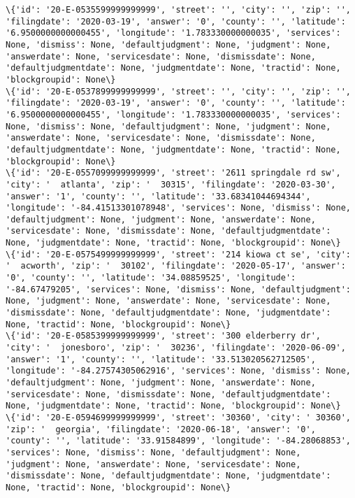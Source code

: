 \documentclass[11pt]{article}
\begin{document}
\begin{Verbatim}[commandchars=\\\{\}]
\{'id': '20-E-0535599999999999', 'street': '', 'city': '', 'zip': '', 'filingdate': '2020-03-19', 'answer': '0', 'county': '', 'latitude': '6.9500000000000455', 'longitude': '1.783330000000035', 'services': None, 'dismiss': None, 'defaultjudgment': None, 'judgment': None, 'answerdate': None, 'servicesdate': None, 'dismissdate': None, 'defaultjudgmentdate': None, 'judgmentdate': None, 'tractid': None, 'blockgroupid': None\}
\{'id': '20-E-0537899999999999', 'street': '', 'city': '', 'zip': '', 'filingdate': '2020-03-19', 'answer': '0', 'county': '', 'latitude': '6.9500000000000455', 'longitude': '1.783330000000035', 'services': None, 'dismiss': None, 'defaultjudgment': None, 'judgment': None, 'answerdate': None, 'servicesdate': None, 'dismissdate': None, 'defaultjudgmentdate': None, 'judgmentdate': None, 'tractid': None, 'blockgroupid': None\}
\{'id': '20-E-0557099999999999', 'street': '2611 springdale rd sw', 'city': '  atlanta', 'zip': '  30315', 'filingdate': '2020-03-30', 'answer': '1', 'county': '', 'latitude': '33.68341044694344', 'longitude': '-84.41513301078948', 'services': None, 'dismiss': None, 'defaultjudgment': None, 'judgment': None, 'answerdate': None, 'servicesdate': None, 'dismissdate': None, 'defaultjudgmentdate': None, 'judgmentdate': None, 'tractid': None, 'blockgroupid': None\}
\{'id': '20-E-0575499999999999', 'street': '214 kiowa ct se', 'city': '  acworth', 'zip': '  30102', 'filingdate': '2020-05-17', 'answer': '0', 'county': '', 'latitude': '34.08859525', 'longitude': '-84.67479205', 'services': None, 'dismiss': None, 'defaultjudgment': None, 'judgment': None, 'answerdate': None, 'servicesdate': None, 'dismissdate': None, 'defaultjudgmentdate': None, 'judgmentdate': None, 'tractid': None, 'blockgroupid': None\}
\{'id': '20-E-0585399999999999', 'street': '300 elderberry dr', 'city': '  jonesboro', 'zip': '  30236', 'filingdate': '2020-06-09', 'answer': '1', 'county': '', 'latitude': '33.513020562712505', 'longitude': '-84.27574305062916', 'services': None, 'dismiss': None, 'defaultjudgment': None, 'judgment': None, 'answerdate': None, 'servicesdate': None, 'dismissdate': None, 'defaultjudgmentdate': None, 'judgmentdate': None, 'tractid': None, 'blockgroupid': None\}
\{'id': '20-E-0594699999999999', 'street': '30360', 'city': ' 30360', 'zip': '  georgia', 'filingdate': '2020-06-18', 'answer': '0', 'county': '', 'latitude': '33.91584899', 'longitude': '-84.28068853', 'services': None, 'dismiss': None, 'defaultjudgment': None, 'judgment': None, 'answerdate': None, 'servicesdate': None, 'dismissdate': None, 'defaultjudgmentdate': None, 'judgmentdate': None, 'tractid': None, 'blockgroupid': None\}

\end{Verbatim}
\end{document}

